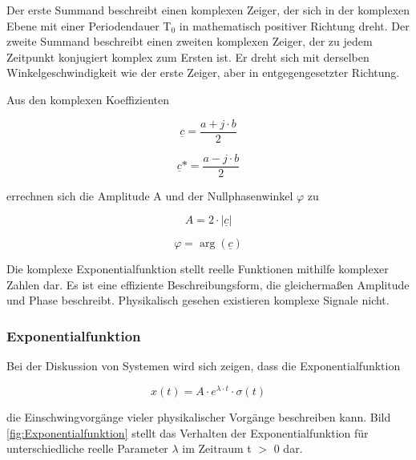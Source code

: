 \noindent Der erste Summand beschreibt einen komplexen Zeiger, der sich in der komplexen Ebene mit einer Periodendauer T${}_{0}$ in mathematisch positiver Richtung dreht. Der zweite Summand beschreibt einen zweiten komplexen Zeiger, der zu jedem Zeitpunkt konjugiert komplex zum Ersten ist. Er dreht sich mit derselben Winkelgeschwindigkeit wie der erste Zeiger, aber in entgegengesetzter Richtung. 

\noindent Aus den komplexen Koeffizienten 

\begin{equation}\label{eq:oneninety}
\underline{c}=\dfrac{a+j\cdot b}{2}
\end{equation}

\begin{equation}\label{eq:oneninetyone}
\underline{c}*=\dfrac{a-j\cdot b}{2}
\end{equation}

\noindent errechnen sich die Amplitude A und der Nullphasenwinkel $\varphi$ zu

\begin{equation}\label{eq:oneninetytwo}
A=2\cdot \left|\underline{c}\right|
\end{equation}

\begin{equation}\label{eq:oneninetythree}
\varphi =\arg \left(\underline{c}\right)
\end{equation}

\noindent Die komplexe Exponentialfunktion stellt reelle Funktionen mithilfe komplexer Zahlen dar. Es ist eine effiziente Beschreibungsform, die gleicherma{\ss}en Amplitude und Phase beschreibt. Physikalisch gesehen existieren komplexe Signale nicht.

\noindent
\noindent


\clearpage


\subsubsection{ Exponentialfunktion}

\noindent Bei der Diskussion von Systemen wird sich zeigen, dass die Exponentialfunktion 

\begin{equation}\label{eq:oneninetyfour}
x\left(t\right)=A\cdot e^{\lambda \cdot t} \cdot \sigma \left(t\right)
\end{equation}

 
\noindent die Einschwingvorgänge vieler physikalischer Vorgänge beschreiben kann. Bild \ref{fig:Exponentialfunktion} stellt das Verhalten der Exponentialfunktion für unterschiedliche reelle Parameter $\lambda$ im Zeitraum t $\mathrm{>}$ 0 dar.

